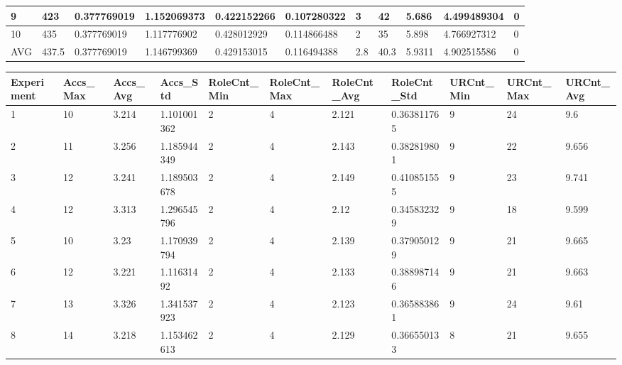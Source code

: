 \begin{table}[H]
\begin{adjustbox}{max width=380pt,keepaspectratio,angle=90}
\begin{tabular}{|l|l|l|l|l|l|l|l|l|l|l|}
						9          & 423   & 0.377769019  & 1.152069373  & 0.422152266  & 0.107280322  & 3         & 42        & 5.686     & 4.499489304 & 0         \\ \hline
						10         & 435   & 0.377769019  & 1.117776902  & 0.428012929  & 0.114866488  & 2         & 35        & 5.898     & 4.766927312 & 0         \\ \hline\hline
						AVG        & 437.5 & 0.377769019  & 1.146799369  & 0.429153015  & 0.116494388  & 2.8       & 40.3      & 5.9311    & 4.902515586 & 0         \\ \hline
					\end{tabular}
				\end{adjustbox}
				\begin{adjustbox}{max width=380pt,keepaspectratio,angle=90}
					\begin{tabular}{|l|l|l|l|l|l|l|l|l|l|l|}
						\rowcolor[HTML]{EFEFEF} 
						\hline
						Experiment & Accs\_Max & Accs\_Avg & Accs\_Std   & RoleCnt\_Min & RoleCnt\_Max & RoleCnt\_Avg & RoleCnt\_Std & URCnt\_Min & URCnt\_Max & URCnt\_Avg \\ \hline
						1          & 10        & 3.214     & 1.101001362 & 2            & 4            & 2.121        & 0.363811765  & 9          & 24         & 9.6        \\ \hline
						2          & 11        & 3.256     & 1.185944349 & 2            & 4            & 2.143        & 0.382819801  & 9          & 22         & 9.656      \\ \hline
						3          & 12        & 3.241     & 1.189503678 & 2            & 4            & 2.149        & 0.410851555  & 9          & 23         & 9.741      \\ \hline
						4          & 12        & 3.313     & 1.296545796 & 2            & 4            & 2.12         & 0.345832329  & 9          & 18         & 9.599      \\ \hline
						5          & 10        & 3.23      & 1.170939794 & 2            & 4            & 2.139        & 0.379050129  & 9          & 21         & 9.665      \\ \hline
						6          & 12        & 3.221     & 1.11631492  & 2            & 4            & 2.133        & 0.388987146  & 9          & 21         & 9.663      \\ \hline
						7          & 13        & 3.326     & 1.341537923 & 2            & 4            & 2.123        & 0.365883861  & 9          & 24         & 9.61       \\ \hline
						8          & 14        & 3.218     & 1.153462613 & 2            & 4            & 2.129        & 0.366550133  & 8          & 21         & 9.655      \\ \hline

\end{tabular}
\end{adjustbox}
\end{table}

